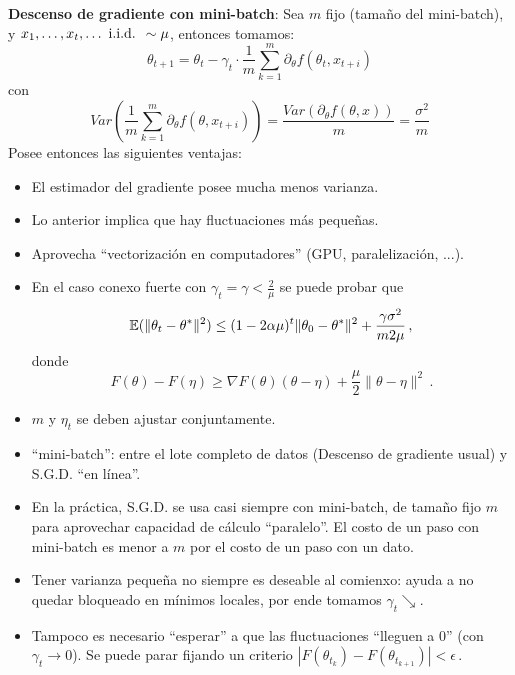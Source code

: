 \newp \textbf{Descenso de gradiente con mini-batch}:
\newline Sea $m$ fijo (tamaño del mini-batch), y $x_1,\dots,x_t,\dots \mbox{ i.i.d. } \sim \mu$, entonces tomamos:
$$ \theta_{t+1}=\theta_t - \gamma_t\cdot \displaystyle\frac{1}{m}\sum^m_{k=1}\partial_\theta f(\theta_t,x_{t+i})$$
con
$$ Var(\displaystyle \frac{1}{m}\sum^m_{k=1}\partial_\theta f(\theta,x_{t+i}))=\frac{Var(\partial_\theta f(\theta,x))}{m}=\frac{\sigma^2}{m}$$
Posee entonces las siguientes ventajas:
\begin{itemize}
    \item El estimador del gradiente posee mucha menos varianza.
    \item Lo anterior implica que hay fluctuaciones más pequeñas.
    \item Aprovecha ``vectorización en computadores'' (GPU, paralelización, ...).
\end{itemize}
\begin{remark}
\beforeitemize
\begin{itemize}
    \item En el caso conexo fuerte con $\gamma_t=\gamma<\frac{2}{\mu}$ se puede probar que
    $$ \mathbb{E}(\|\theta_t-\theta^*\|^2)\leq (1-2 \alpha \mu)^t\|\theta_0-\theta^*\|^2+\frac{\gamma \sigma^2}{m 2\mu}\,,$$
    donde 
    $$ F(\theta)-F(\eta)\geq \nabla F(\theta)(\theta-\eta)+\frac{\mu}{2}\|\theta-\eta\|^2\,.$$
    \item $m$ y $\eta_t$ se deben ajustar conjuntamente.
    \item ``mini-batch'': entre el lote completo de datos (Descenso de gradiente usual) y S.G.D. ``en línea''.
    \item En la práctica, S.G.D. se usa casi siempre con mini-batch, de tamaño fijo $m$ para aprovechar capacidad de cálculo ``paralelo''. El costo de un paso con mini-batch es menor a $m$ por el costo de un paso con un dato.
    \item Tener varianza pequeña no siempre es deseable al comienxo: ayuda a no quedar bloqueado en mínimos locales, por ende tomamos $\gamma_t\searrow$.
    \item Tampoco es necesario ``esperar'' a que las fluctuaciones ``lleguen a $0$'' (con $\gamma_t\to 0$).
    \newline Se puede parar fijando un criterio $|F(\theta_{t_k})-F(\theta_{t_{k+1}})|<\epsilon$\,.
\end{itemize}
\end{remark}

